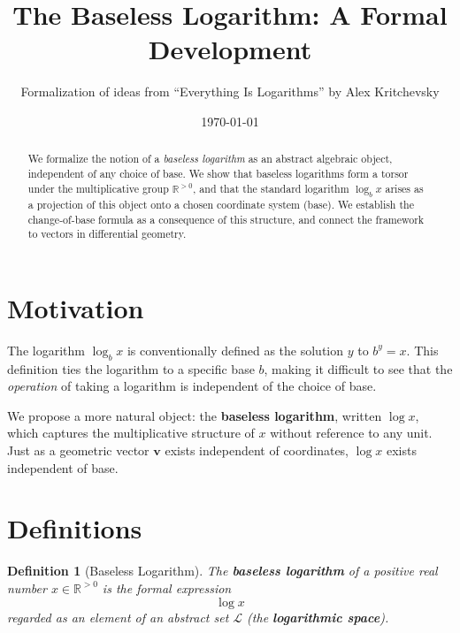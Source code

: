 \documentclass[11pt]{article}
\title{The Baseless Logarithm: A Formal Development}
\author{Formalization of ideas from ``Everything Is Logarithms'' by Alex Kritchevsky}
\date{\today}
\newtheorem{definition}{Definition}[section]
\begin{document}
\maketitle

\begin{abstract}
We formalize the notion of a \emph{baseless logarithm} as an abstract algebraic object, independent of any choice of base. We show that baseless logarithms form a torsor under the multiplicative group $\mathbb{R}^{>0}$, and that the standard logarithm $\log_b x$ arises as a projection of this object onto a chosen coordinate system (base). We establish the change-of-base formula as a consequence of this structure, and connect the framework to vectors in differential geometry.
\end{abstract}

\tableofcontents
\newpage

\section{Motivation}
\label{sec:motivation}

The logarithm $\log_b x$ is conventionally defined as the solution $y$ to $b^y = x$. This definition ties the logarithm to a specific base $b$, making it difficult to see that the \emph{operation} of taking a logarithm is independent of the choice of base.

We propose a more natural object: the \textbf{baseless logarithm}, written $\log x$, which captures the multiplicative structure of $x$ without reference to any unit. Just as a geometric vector $\mathbf{v}$ exists independent of coordinates, $\log x$ exists independent of base.

\section{Definitions}
\label{sec:definitions}

\begin{definition}[Baseless Logarithm]
\label{def:baseless}
The \textbf{baseless logarithm} of a positive real number $x \in \mathbb{R}^{>0}$ is the formal expression
\[
\log x
\]
regarded as an element of an abstract set $\mathcal{L}$ (the \textbf{logarithmic space}).
\end{definition}
\end{document}
